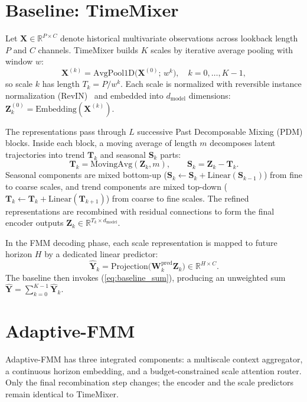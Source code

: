 \documentclass[journal]{IEEEtran}
\begin{document}
\section{Baseline: TimeMixer}
\label{sec:baseline}
Let $\mathbf{X} \in \mathbb{R}^{P \times C}$ denote historical multivariate observations across lookback length $P$ and $C$ channels. TimeMixer builds $K$ scales by iterative average pooling with window $w$:
\begin{equation}
\mathbf{X}^{(k)} = \mathrm{AvgPool1D}\big(\mathbf{X}^{(0)};\, w^{k}\big),
\quad k = 0,\dots,K-1,
\end{equation}
so scale $k$ has length $T_k = P/w^{k}$. Each scale is normalized with reversible instance normalization (RevIN)~\cite{kim2021reversible} and embedded into $d_{\text{model}}$ dimensions: $\mathbf{Z}_k^{(0)} = \mathrm{Embedding}(\mathbf{X}^{(k)})$.

The representations pass through $L$ successive Past Decomposable Mixing (PDM) blocks. Inside each block, a moving average of length $m$ decomposes latent trajectories into trend $\mathbf{T}_k$ and seasonal $\mathbf{S}_k$ parts:
\begin{equation}
\mathbf{T}_k = \mathrm{MovingAvg}(\mathbf{Z}_k, m), \qquad
\mathbf{S}_k = \mathbf{Z}_k - \mathbf{T}_k .
\end{equation}
Seasonal components are mixed bottom-up ($\mathbf{S}_k \leftarrow \mathbf{S}_k + \mathrm{Linear}(\mathbf{S}_{k-1})$) from fine to coarse scales, and trend components are mixed top-down ($\mathbf{T}_k \leftarrow \mathbf{T}_k + \mathrm{Linear}(\mathbf{T}_{k+1})$) from coarse to fine scales. The refined representations are recombined with residual connections to form the final encoder outputs $\mathbf{Z}_k \in \mathbb{R}^{T_k \times d_{\text{model}}}$.

In the FMM decoding phase, each scale representation is mapped to future horizon $H$ by a dedicated linear predictor:
\begin{equation}
\hat{\mathbf{Y}}_k = \mathrm{Projection}\big(\mathbf{W}_k^{\text{pred}} \mathbf{Z}_k\big) \in \mathbb{R}^{H \times C}.
\end{equation}
The baseline then invokes (\ref{eq:baseline_sum}), producing an unweighted sum $\hat{\mathbf{Y}} = \sum_{k=0}^{K-1} \hat{\mathbf{Y}}_k$.

\section{Adaptive-FMM}
\label{sec:method}
Adaptive-FMM has three integrated components: a multiscale context aggregator, a continuous horizon embedding, and a budget-constrained scale attention router. Only the final recombination step changes; the encoder and the scale predictors remain identical to TimeMixer.
\end{document}
